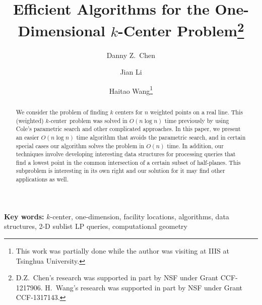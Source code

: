 \documentclass{llncs}
\def\cen{$k$-center}
\begin{document}
\title{Efficient Algorithms for the One-Dimensional $k$-Center Problem\thanks{D.Z.~Chen's research was supported in part by NSF
under Grant CCF-1217906. H.~Wang's research was supported in part by NSF under Grant CCF-1317143.}}

\author{Danny Z.~Chen \and Jian Li
\and Haitao Wang\thanks{This work was partially done while the
author was visiting at IIIS at Tsinghua University.}}


\maketitle

\pagestyle{plain}
\setcounter{page}{1}


\begin{abstract}
We consider the problem of finding $k$ centers for $n$ weighted points on a real line.
This (weighted) \cen\ problem was solved in $O(n\log n)$ time previously by using Cole's parametric search and other complicated approaches. In this paper, we present an easier $O(n\log n)$ time algorithm that avoids the parametric search, and in certain special cases our algorithm solves the problem
in $O(n)$ time. In addition, our techniques involve developing interesting data structures for processing queries that find a
lowest point in the common intersection of a certain subset of half-planes. This subproblem is interesting in its own right and our solution for it may find other applications as well.
\end{abstract}

{\bf Key words:} $k$-center, one-dimension, facility locations, algorithms, data structures, 2-D sublist LP queries, computational geometry
\end{document}

